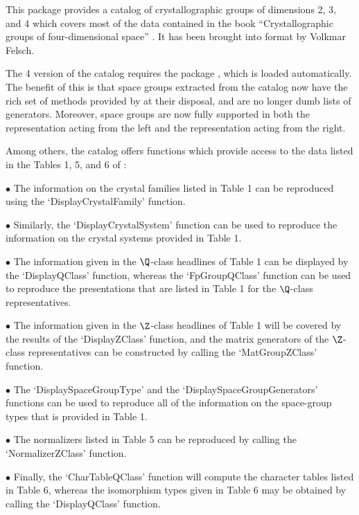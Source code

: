 \def\x{\times}



This package provides a catalog of crystallographic groups of
dimensions 2, 3, and 4 which covers most of the data contained 
in the book ``Crystallographic groups of four-dimensional space''
\cite{BBNWZ78}.  It has been brought into {\GAP} format by Volkmar
Felsch.

The {\GAP} 4 version of the catalog requires the package {\Cryst},
which is loaded automatically. The benefit of this is that space groups 
extracted from the catalog now have the rich set of methods provided
by {\Cryst} at their disposal, and are no longer dumb lists of generators.
Moreover, space groups are now fully supported in both the representation
acting from the left and the representation acting from the right.


Among others, the catalog offers functions which provide access to the
data listed in the Tables 1, 5, and 6 of \cite{BBNWZ78}:

\beginlist%
\item{$\bullet$} 
    The information on the crystal families listed in Table 1 can
    be reproduced using the `DisplayCrystalFamily' function.
\item{$\bullet$} 
    Similarly, the `DisplayCrystalSystem' function can be
    used to reproduce the information on the crystal systems
    provided in Table 1.
\item{$\bullet$} 
    The information given in the $\Q$-class headlines of
    Table 1 can be displayed by the `DisplayQClass' function,
    whereas the `FpGroupQClass' function can be used to reproduce
    the presentations that are listed in Table 1 for the $\Q$-class
    representatives.
\item{$\bullet$} 
    The information given in the $\Z$-class headlines of Table 1
    will be covered by the results of the `DisplayZClass' function,
    and the matrix generators of the $\Z$-class representatives can
    be constructed by calling the `MatGroupZClass' function.
\item{$\bullet$} 
    The `DisplaySpaceGroupType' and the
    `DisplaySpaceGroupGenerators' functions can be used to
    reproduce all of the information on the space-group types that
    is provided in Table 1.
\item{$\bullet$} 
    The normalizers listed in Table 5 can be reproduced by
    calling the `NormalizerZClass' function.
\item{$\bullet$} 
    Finally, the `CharTableQClass' function will compute the
    character tables listed in Table 6, whereas the isomorphism
    types given in Table 6 may be obtained by calling the
    `DisplayQClass' function.  
\endlist

